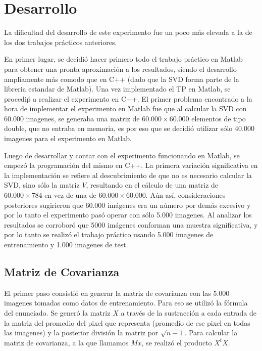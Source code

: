 \section{Desarrollo}
La dificultad del desarrollo de este experimento fue un poco m\'as elevada a la de los dos 
trabajos pr\'acticos anteriores. 

En primer lugar, se decidi\'o hacer primero todo el trabajo pr\'actico en Matlab para obtener 
una pronta aproximaci\'on a los resultados, siendo el desarrollo ampliamente m\'as comodo que 
en C++ (dado que la SVD forma parte de la libreria estandar de Matlab). Una vez implementado 
el TP en Matlab, se procedi\'p a realizar el experimento en C++. El primer problema encontrado 
a la hora de implementar el experimento en Matlab fue que al calcular la SVD con 60.000 imagenes, 
se generaba una matriz de $60.000 \times 60.000$ elementos de tipo double, que no entraba en
memoria, es por eso que se decidi\'o utilizar s\'olo 40.000 imagenes para el experimento en Matlab.

Luego de desarrollar y contar con el experimento funcionando en Matlab, se empez\'o la programaci\'on
del mismo en C++. La primera variaci\'on significativa en la implementaci\'on se refiere al 
descubrimiento de que no es necesario calcular la SVD, sino s\'olo la matriz $V$, resultando 
en el c\'alculo de una matriz de $60.000 \times 784$ en vez de una de $60.000 \times 60.000$.
A\'un as\'i, consideraciones posteriores sugirieron que 60.000 im\'agenes era un n\'umero por 
dem\'as excesivo y por lo tanto el experimento pas\'o operar con s\'olo 5.000 imagenes. 
Al analizar los resultados se corrobor\'o que 5000 im\'agenes conforman una muestra significativa, 
y por lo tanto se realiz\'o el trabajo pr\'actico usando 5.000 imagenes de entrenamiento y 1.000 imagenes de test.

\subsection{Matriz de Covarianza}
El primer paso consisti\'o en generar la matriz de covarianza con las 5.000 imagenes tomadas como datos 
de entrenamiento. Para eso se utiliz\'o la f\'ormula del enunciado. Se gener\'o la matriz $X$ a trav\'es 
de la sustracci\'on a cada entrada de la matriz del promedio del pixel que representa (promedio de ese 
pixel en todas las imagenes) y la posterior divisi\'on la matriz por $\sqrt{n-1}$. Para calcular la
matriz de covarianza, a la que llamamos $Mx$, se realiz\'o el producto $X^tX$.

